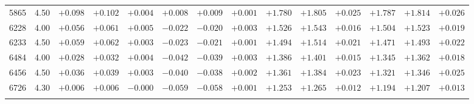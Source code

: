 \documentclass[]{aa}
\begin{document}
\begin{appendix}
\begin{table*}
\begin{center}
\begin{tabular}{llllllllllllll}
5865  &4.50 & $+0.098$ & $+0.102$ & $+0.004$ & $+0.008$ & $+0.009$ & $+0.001$ & $+1.780$ & $+1.805$ & $+0.025$ & $+1.787$ & $+1.814$ & $+0.026$ \\
6228  &4.00 & $+0.056$ & $+0.061$ & $+0.005$ & $-0.022$ & $-0.020$ & $+0.003$ & $+1.526$ & $+1.543$ & $+0.016$ & $+1.504$ & $+1.523$ & $+0.019$ \\
6233  &4.50 & $+0.059$ & $+0.062$ & $+0.003$ & $-0.023$ & $-0.021$ & $+0.001$ & $+1.494$ & $+1.514$ & $+0.021$ & $+1.471$ & $+1.493$ & $+0.022$ \\
6484  &4.00 & $+0.028$ & $+0.032$ & $+0.004$ & $-0.042$ & $-0.039$ & $+0.003$ & $+1.386$ & $+1.401$ & $+0.015$ & $+1.345$ & $+1.362$ & $+0.018$ \\
6456  &4.50 & $+0.036$ & $+0.039$ & $+0.003$ & $-0.040$ & $-0.038$ & $+0.002$ & $+1.361$ & $+1.384$ & $+0.023$ & $+1.321$ & $+1.346$ & $+0.025$ \\
6726  &4.30 & $+0.006$ & $+0.006$ & $-0.000$ & $-0.059$ & $-0.058$ & $+0.001$ & $+1.253$ & $+1.265$ & $+0.012$ & $+1.194$ & $+1.207$ & $+0.013$ \\
\hline\noalign{\smallskip}
\hline\noalign{\smallskip}
\end{tabular}
\end{center}
\end{table*}


\end{appendix}
\end{document}
